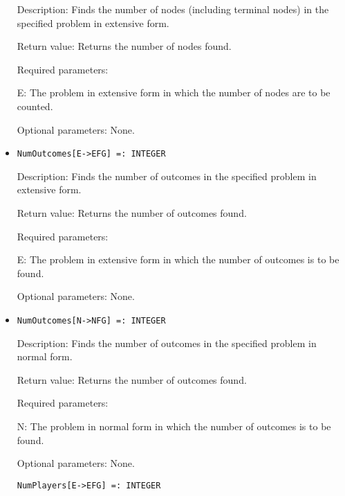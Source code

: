 \begin{itemize}
\bd
\item
[Description:] Finds the number of nodes (including terminal nodes) in
the specified problem in extensive form.
\item
[Return value:] Returns the number of nodes found.
\item
[Required parameters:]\hfil\null

\bd
\item
[E:] The problem in extensive form in which the number of nodes are to
be counted.
\ed

\item
[Optional parameters:] None.
\ed

\item
\protect \large \begin{verbatim}
NumOutcomes[E->EFG] =: INTEGER
\end{verbatim} \normalsize

\bd
\item
[Description:] Finds the number of outcomes in the specified problem
in extensive form.
\item
[Return value:] Returns the number of outcomes found.
\item
[Required parameters:] \hfil\null

\bd
\item
[E:] The problem in extensive form in which the number of outcomes is
to be found.
\ed

\item
[Optional parameters:] None.
\ed

\item
\protect \large \begin{verbatim}
NumOutcomes[N->NFG] =: INTEGER
\end{verbatim}\normalsize

\bd
\item
[Description:] Finds the number of outcomes in the specified problem
in normal form.
\item
[Return value:] Returns the number of outcomes found.
\item
[Required parameters:]\hfil\null
	
\bd
\item
[N:] The problem in normal form in which the number of outcomes is to
be found.
\ed

\item
[Optional parameters:] None.
\ed

\protect \large \begin{verbatim}
NumPlayers[E->EFG] =: INTEGER
\end{verbatim} \normalsize


\end{itemize}
